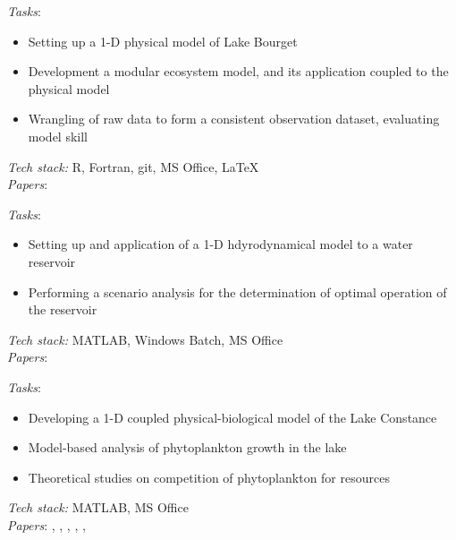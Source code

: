 \documentclass[
	a4paper,
]{fortysecondscv}
\begin{document}
\begin{cvtable}[1.0]
	{\href{https://www.inrae.fr/en}{\color{pblue}{INRAe, France}}}
	{\textit{Tasks}:
	\begin{itemize}[topsep=0pt,itemsep=0pt,partopsep=0pt, parsep=0pt, leftmargin=*]
     \item Setting up a 1-D physical model of Lake Bourget
     \item Development a modular ecosystem model, and its application coupled to the physical model
     \item Wrangling of raw data to form a consistent observation dataset, evaluating model skill 
    \end{itemize}
      \textit{Tech stack:} R, Fortran, git, MS Office, \LaTeX \\
      \textit{Papers}:
      \href{https://doi.org/10.1111/fwb.12444}{\color{pblue}{1}}
      \href{https://doi.org/10.1007/s10021-014-9837-6}{\color{pblue}{2}}
      \href{https://doi.org/10.1016/j.ecolmodel.2017.06.005}{\color{pblue}{3}}
      \href{https://doi.org/10.1016/j.envsoft.2017.11.016}{\color{pblue}{4}}
      }       

	{\href{https://www.ufz.de/en}{\color{pblue}{UFZ, Germany}}}
	{\textit{Tasks}:
	\begin{itemize}[topsep=0pt,itemsep=0pt,partopsep=0pt, parsep=0pt, leftmargin=*]
     \item Setting up and application of a 1-D hdyrodynamical model to a water reservoir
     \item Performing a scenario analysis for the determination of optimal operation of the reservoir
    \end{itemize}
      \textit{Tech stack:} MATLAB, Windows Batch, MS Office \\
      \textit{Papers}:
      \href{https://doi.org/10.1002/2013WR013520}{\color{pblue}{1}}
      }
      
	{\href{https://www.uni-konstanz.de/}{\color{pblue}{Uni. Konstanz, Germany}}}
	{\textit{Tasks}:
	\begin{itemize}[topsep=0pt,itemsep=0pt,partopsep=0pt, parsep=0pt, leftmargin=*]
     \item Developing a 1-D coupled physical-biological model of the Lake Constance
     \item Model-based analysis of phytoplankton growth in the lake
     \item Theoretical studies on competition of phytoplankton for resources 
    \end{itemize}
      \textit{Tech stack:} MATLAB, MS Office \\
      \textit{Papers}:
      \href{https://doi.org/10.1111/j.1365-2486.2009.02158.x}{\color{pblue}{1}},
      \href{https://doi.org/10.1016/j.jtbi.2012.01.044}{\color{pblue}{2}},
      \href{https://doi.org/10.1007/s12080-012-0164-2}{\color{pblue}{3}},
      \href{https://doi.org/10.1111/j.1600-0706.2012.20603.x}{\color{pblue}{4}},
      \href{https://doi.org/10.1007/s10750-013-1551-4}{\color{pblue}{5}},
      \href{https://doi.org/10.1890/14-0839.1}{\color{pblue}{6}}
      }
      

\end{cvtable}
\end{document}
